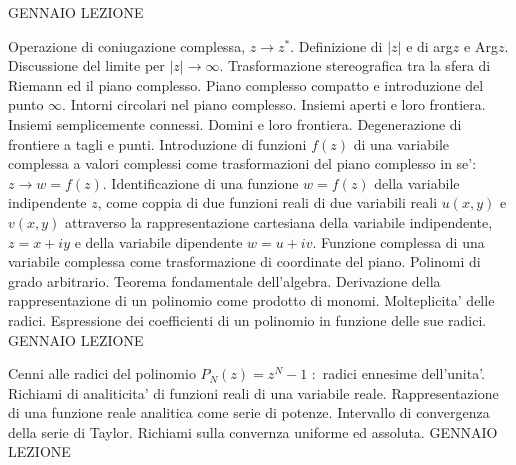 \documentclass[,12pt]{article}
\begin{document}
\vskip 20pt
 GENNAIO
\hskip 20pt
LEZIONE

\noindent
Operazione di coniugazione complessa, $z\rightarrow z^\ast$. Definizione
di $|z|$ e di arg$z$ e Arg$z$. Discussione del limite per $|z|\rightarrow
\infty$. Trasformazione stereografica tra la sfera di Riemann ed il piano
complesso. Piano complesso compatto e introduzione del punto $\infty$.
Intorni circolari nel piano complesso. Insiemi aperti e loro frontiera.
Insiemi semplicemente connessi. Domini e loro frontiera. Degenerazione di
frontiere a tagli e punti. Introduzione di funzioni $f(z)$ di
una variabile complessa a valori complessi come trasformazioni del piano
complesso in se':
$z\rightarrow w=f(z)$. Identificazione di una funzione $w=f(z)$ della
variabile indipendente $z$, come coppia di due funzioni reali di due
variabili reali $u(x,y)$ e $v(x,y)$ attraverso la rappresentazione
cartesiana della variabile indipendente, $z=x+iy$ e della variabile
dipendente $w=u+iv$. Funzione complessa di una variabile complessa come
trasformazione di coordinate del piano. Polinomi di grado arbitrario.
Teorema fondamentale dell'algebra. Derivazione della rappresentazione di
un polinomio come prodotto di monomi. Molteplicita' delle radici.
Espressione dei coefficienti di un polinomio in funzione delle sue
radici.
\vskip 20pt
 GENNAIO
\hskip 20pt
LEZIONE

\noindent
 Cenni alle radici del polinomio
$P_N(z)=z^N-1$ :\ radici ennesime dell'unita'. Richiami di analiticita'
di funzioni reali di una variabile reale. Rappresentazione di una
funzione reale analitica come serie di potenze. Intervallo di convergenza
della serie di Taylor. Richiami sulla convernza uniforme ed assoluta.
\vskip 20pt
 GENNAIO
\hskip 20pt
LEZIONE
\end{document}
